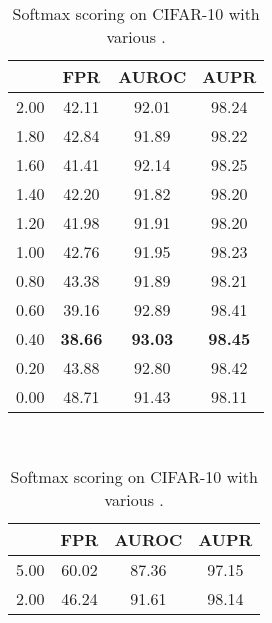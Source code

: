 \documentclass{article}
\begin{document}
\vspace{-5pt}


\begin{table}[t]
\centering
\parbox{.30\linewidth}{
\centering
\scriptsize
\caption{Softmax scoring on CIFAR- with various .} \label{tab: 18}
\vspace{5pt}
{
\begin{tabular}{c|ccc}
\toprule[1.5pt]
             & FPR     & AUROC       & AUPR      \\
\midrule[0.6pt]
2.00               & 42.11                  & 92.01                  & 98.24      \\
1.80               & 42.84                  & 91.89                  & 98.22      \\
1.60               & 41.41                  & 92.14                  & 98.25       \\
1.40               & 42.20                  & 91.82                  & 98.20      \\
1.20               & 41.98                  & 91.91                  & 98.20      \\
1.00               & 42.76                  & 91.95                  & 98.23 \\ 
0.80               & 43.38                  & 91.89                  & 98.21 \\
0.60               & 39.16                  & 92.89                  & 98.41 \\ 
\cellcolor{greyC}0.40               & \cellcolor{greyC}\textbf{38.66}                  & \cellcolor{greyC}\textbf{93.03}                  & \cellcolor{greyC}\textbf{98.45} \\
0.20               & 43.88         & 92.80         & 98.42 \\
0.00               & 48.71                  & 91.43                  & 98.11 \\ 
\bottomrule[1.5pt]      
\end{tabular}
}}~~
\parbox{.30\linewidth}{
\centering
\caption{Softmax scoring on CIFAR-10 with various .} 
\scriptsize
\vspace{5pt}
{
\begin{tabular}{c|ccc}
\toprule[1.5pt]
            & FPR     & AUROC      & AUPR      \\
\midrule[0.6pt]
5.00               & 60.02                  & 87.36                  & 97.15       \\
2.00               & 46.24                  & 91.61                  & 98.14       \\

\end{tabular}}}
\end{table}
\end{document}
